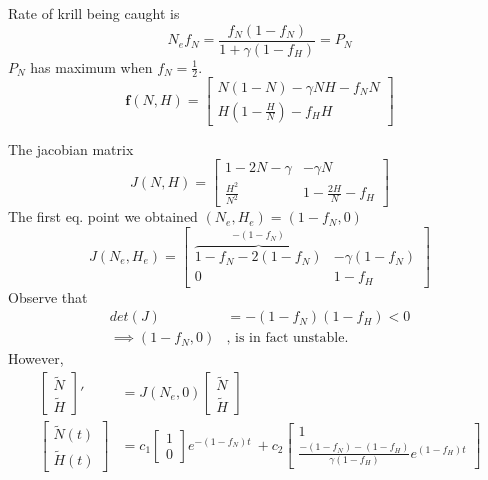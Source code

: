 \documentclass{article}
\theoremstyle{remark}
\begin{document}
  Rate of krill being caught is \[
  N_{e} f_{N} = \frac{f_{N} \left( 1 - f_{N} \right)}{ 1 + \gamma  \left( 1 - f_{H} \right) }  = P_{N}
  \] 
  $P_{N}$ has maximum when $f_{N} = \frac{1}{2}$.  \[
  \mathbf{f}\left( N,H \right) =  
  \begin{bmatrix} 
  N\left( 1 - N \right) - \gamma  NH - f_{N}N \\
  H\left(  1 - \frac{H}{N} \right) - f_{H}H 
  \end{bmatrix} 
  \] 

  The jacobian matrix \[
  J\left( N, H \right) = \begin{bmatrix} 
  1 - 2N - \gamma   &  -\gamma N \\
  \frac{H^2}{N^2}   &  1- \frac{2H}{N} - f_{H}
  \end{bmatrix} 
  \] 
  The first eq. point we obtained $\left( N_{e}, H_{e} \right) = \left( 1 - f_{N}, 0 \right)$ \[
  J\left( N_{e}, H_{e} \right) = \begin{bmatrix} 
  \overbrace{1 - f_{N} - 2 \left( 1 - f_{N} \right)}^{- \left( 1 - f_{N} \right)}   &  - \gamma \left( 1 - f_{N} \right) \\
  0  & 1 - f_{H}
  \end{bmatrix} 
  \] 
  Observe that \[
    \begin{split}
  det\left( J \right) &=  - \left( 1 - f_{N} \right) \left( 1 - f_{H} \right) < 0 \\
  \implies  \left( 1 - f_{N}, 0 \right)  & , \text{ is in fact unstable.}
    \end{split} 
  \] 
  However,
  \[
   \begin{split}
    \begin{bmatrix} 
    \widetilde{N} \\
    \widetilde{H}
    \end{bmatrix} 
    '  & = J\left( N_{e}, 0 \right) \begin{bmatrix} 
    \widetilde{N} \\
    \widetilde{H}
    \end{bmatrix}  \\
    \begin{bmatrix} 
    \widetilde{N}\left( t \right) \\
    \widetilde{H}\left( t \right)
    \end{bmatrix}  
    &= c_{1}
    \begin{bmatrix} 
    1 \\
    0
    \end{bmatrix} 
    e^{- \left( 1 - f_{N} \right)t} \
   + c_{2} \begin{bmatrix} 
   1  \\
   \frac{- \left( 1 - f_{N} \right) - \left( 1 - f_{H} \right)}{\gamma \left( 1 - f_{H} \right)} e^{\left( 1 - f_{H} \right)t}
   \end{bmatrix} 
   \end{split}  
  \] 
\end{document}
